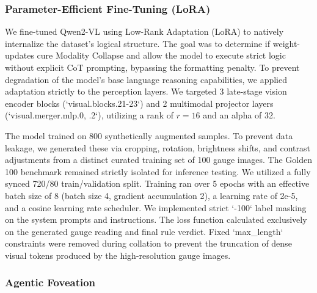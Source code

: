\documentclass{article}
\begin{document}
\subsubsection*{Parameter-Efficient Fine-Tuning (LoRA)}

We fine-tuned Qwen2-VL using Low-Rank Adaptation (LoRA) to natively internalize the dataset's logical structure. The goal was to determine if weight-updates cure Modality Collapse and allow the model to execute strict logic without explicit CoT prompting, bypassing the formatting penalty. To prevent degradation of the model's base language reasoning capabilities, we applied adaptation strictly to the perception layers. We targeted 3 late-stage vision encoder blocks (`visual.blocks.21-23`) and 2 multimodal projector layers (`visual.merger.mlp.0, .2`), utilizing a rank of $r=16$ and an alpha of 32.

The model trained on 800 synthetically augmented samples. To prevent data leakage, we generated these via cropping, rotation, brightness shifts, and contrast adjustments from a distinct curated training set of 100 gauge images. The Golden 100 benchmark remained strictly isolated for inference testing. We utilized a fully synced 720/80 train/validation split. Training ran over 5 epochs with an effective batch size of 8 (batch size 4, gradient accumulation 2), a learning rate of 2e-5, and a cosine learning rate scheduler. We implemented strict `-100` label masking on the system prompts and instructions. The loss function calculated exclusively on the generated gauge reading and final rule verdict. Fixed `max\_length` constraints were removed during collation to prevent the truncation of dense visual tokens produced by the high-resolution gauge images.

\subsubsection*{Agentic Foveation}
\end{document}
